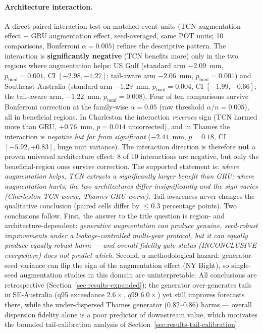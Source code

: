 \paragraph{Architecture interaction.} A direct paired interaction test on
matched event units (TCN augmentation effect $-$ GRU augmentation effect,
seed-averaged, same POT units; 10 comparisons, Bonferroni
$\alpha = 0.005$) refines the descriptive pattern. The interaction is
\textbf{significantly negative} (TCN benefits more) only in the two
regions where augmentation helps: US Gulf (standard arm $-2.09$~mm,
$p_{\text{bonf}} = 0.001$, CI $[-2.98,-1.27]$; tail-aware arm $-2.06$~mm,
$p_{\text{bonf}} = 0.001$) and Southeast Australia (standard arm
$-1.29$~mm, $p_{\text{bonf}} = 0.004$, CI $[-1.99,-0.66]$; the tail-aware
arm, $-1.22$~mm, $p_{\text{bonf}} = 0.008$). Four of ten comparisons
survive Bonferroni correction at the family-wise $\alpha=0.05$ (raw
threshold $\alpha/n=0.005$), all in beneficial regions. In Charleston the interaction \emph{reverses} sign
(TCN harmed more than GRU, $+0.76$~mm, $p=0.014$ uncorrected), and in
Thames the interaction is \emph{negative but far from significant}
($-2.41$~mm, $p=0.18$, CI $[-5.92,+0.83]$, huge unit variance). The
interaction direction is therefore \textbf{not} a proven universal
architecture effect: 8 of 10 interactions are negative, but only the
beneficial-region ones survive
correction. The supported statement is: \emph{where augmentation helps,
TCN extracts a significantly larger benefit than GRU; where augmentation
hurts, the two architectures differ insignificantly and the sign varies
(Charleston TCN worse, Thames GRU worse)}. Tail-awareness never changes
the qualitative conclusion (paired cells differ by $\le 0.3$ percentage
points). Two conclusions follow. First, the answer to the title question
is region- and architecture-dependent: \emph{generative augmentation can
produce genuine, seed-robust improvements under a leakage-controlled
multi-year protocol, but it can equally produce equally robust harm ---
and overall fidelity gate status (INCONCLUSIVE everywhere) does not
predict which}. Second, a methodological hazard: generator-seed variance
can flip the sign of the augmentation effect (NY Bight), so single-seed
augmentation studies in this domain are uninterpretable. All conclusions
are retrospective (Section~\ref{sec:results-expanded}); the generator
over-generates tails in SE-Australia (q95 exceedance $2.6\times$,
$q99$ $6.0\times$) yet still improves forecasts there, while the
under-dispersed Thames generator ($0.82$--$0.86$) harms --- overall
dispersion fidelity alone is a poor predictor of downstream value, which
motivates the bounded tail-calibration analysis of
Section~\ref{sec:results-tail-calibration}.

